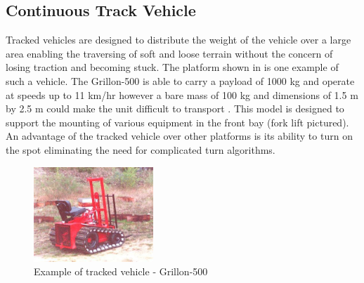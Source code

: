 \documentclass[main.tex]{subfiles}
\begin{document}
\subsection{Continuous Track Vehicle}
Tracked vehicles are designed to distribute the weight of the vehicle over a large area enabling the traversing of soft and loose terrain without the concern of losing traction and becoming stuck. The platform shown in  is one example of such a vehicle. The Grillon-500 is able to carry a payload of 1000 kg and operate at speeds up to 11 km/hr however a bare mass of 100 kg and dimensions of 1.5 m by 2.5 m could make the unit difficult to transport \parencite{cinamGrillon}. This model is designed to support the mounting of various equipment in the front bay (fork lift pictured). An advantage of the tracked vehicle over other platforms is its ability to turn on the spot eliminating the need for complicated turn algorithms. 
\begin{figure}[ht]
\includegraphics[width=0.4\textwidth]{4-ConceptDesign/Grillon-500.jpg}
\centering
\caption[Example of tracked vehicle - Grillon-500]{Example of tracked vehicle - Grillon-500 \parencite{cinamGrillon}} 
\end{figure}
\end{document}
